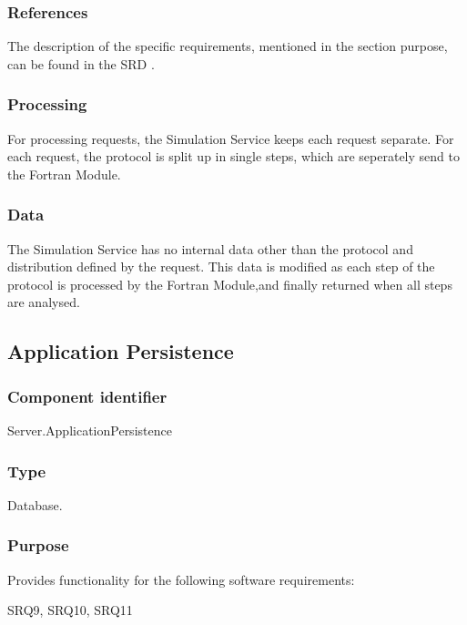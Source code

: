 \subsubsection*{References}
The description of the specific requirements, mentioned in the section purpose, can be found in the SRD \cite{srd}.

\subsubsection*{Processing}
For processing requests, the Simulation Service keeps each request separate. For each request, the protocol is split up in single steps, which are seperately send to the Fortran Module.

\subsubsection*{Data}
The Simulation Service has no internal data other than the protocol and distribution defined by the request. This data is modified as each step of the protocol is processed by the Fortran Module,and finally returned when all steps are analysed.

\subsection{Application Persistence}
\label{subsec:apppersistence}

\subsubsection*{Component identifier}
Server.ApplicationPersistence

\subsubsection*{Type}
Database.

\subsubsection*{Purpose}
Provides functionality for the following software requirements:

\noindent SRQ9, SRQ10, SRQ11

